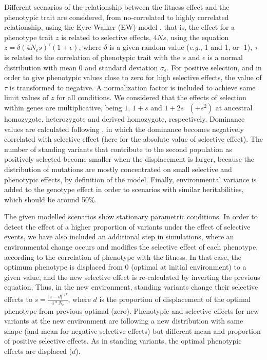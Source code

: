 \documentclass[a4paper,11pt]{article}
\begin{document}
Different scenarios of the relationship between the fitness effect and the phenotypic trait are considered, from no-correlated to highly correlated relationship, using the Eyre-Walker (EW) model \citep{Eyre-Walker:2010aa}, that is, the effect for a phenotype trait $z$ is related to selective effects, $4Ns$, using the equation $z=\delta (4N_e s)^\tau (1+\epsilon)$, where $\delta$ is a given random value (\textit{e.g.},-1 and 1, or -1), $\tau$ is related to the correlation of phenotypic trait with the $s$ and $\epsilon$ is a normal distribution with mean 0 and standard deviation $\sigma_{\epsilon}$. For positive selection, and in order to give phenotypic values close to zero for high selective effects, the value of $\tau$ is transformed to negative. A normalization factor is included to achieve same limit values of $z$ for all conditions. We considered that the effects of selection within genes are multiplicative, being $1$, $1+s$ and $1+2s\text{ }(+s^2)$ at ancestral homozygote, heterozygote and derived homozygote, respectively. Dominance values are calculated following \citep{Wang:1998aa}, in which the dominance becomes negatively correlated with selective effect (here for the absolute value of selective effect).  The number of standing variants that contribute to the second  population as positively selected become smaller when the displacement is larger, because the distribution of mutations are mostly concentrated on small selective and phenotypic effects, by definition of the model. Finally, environmental variance is added to the genotype effect in order to scenarios with similar heritabilities, which should be around 50\%. 

The given modelled scenarios show stationary parametric conditions. In order to detect the effect of a higher proportion of variants under the effect of selective events, we have also included an additional step in simulations, where an environmental change occurs and modifies the selective effect of each phenotype, according to the correlation of phenotype with the fitness. In that case, the optimum phenotype is displaced from 0 (optimal at initial environment) to a given value, and the new selective effect is re-calculated by inverting the previous equation, Thus, in the new environment, standing variants change their selective effects to $s=\frac{|z-d|^{1/\tau}}{4*N_e}$, where $d$ is the proportion of displacement of the optimal phenotype from previous optimal (zero). Phenotypic and selective effects for new variants at the new environment are following a new distribution with same shape (and mean for negative selective effects) but different mean and proportion of positive selective effects. As in standing variants, the optimal phenotypic effects are displaced ($d$). %
\end{document}
